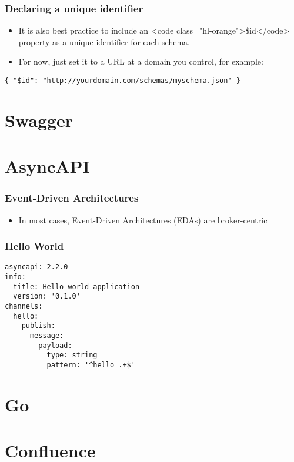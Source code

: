 \documentclass{efd-lecture}
\begin{document}
\begin{frame}[fragile]
  \frametitle{Declaring a unique identifier}
  \begin{itemize}
    \item It is also best practice to include an
      <code class="hl-orange">\$id</code> property as a unique identifier for
      each schema.
    \item For now, just set it to a URL at a domain you control, for example:
  \end{itemize}
  \begin{verbatim}
{ "$id": "http://yourdomain.com/schemas/myschema.json" }
  \end{verbatim}
\end{frame}

\section{Swagger}

\section{AsyncAPI}

\begin{frame}
  \frametitle{Event-Driven Architectures}
  \begin{itemize}
    \item In most cases, Event-Driven Architectures (EDAs) are broker-centric
  \end{itemize}
\end{frame}

\begin{frame}[fragile]
  \frametitle{Hello World}
  \begin{verbatim}
asyncapi: 2.2.0
info:
  title: Hello world application
  version: '0.1.0'
channels:
  hello:
    publish:
      message:
        payload:
          type: string
          pattern: '^hello .+$'
  \end{verbatim}
\end{frame}

\section{Go}

\section{Confluence}
\end{document}
